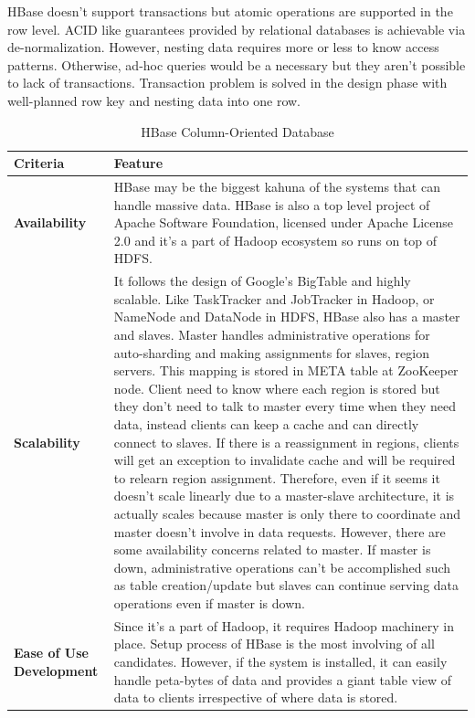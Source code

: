 HBase doesn't support transactions but atomic operations are supported in the row level. ACID like guarantees provided by relational databases is achievable via de-normalization. However, nesting data requires more or less to know access patterns. Otherwise, ad-hoc queries would be a necessary but they aren't possible to lack of transactions. Transaction problem is solved in the design phase with well-planned row key and nesting data into one row.

\begin{table}[!ht]
  \centering
  \caption{HBase Column-Oriented Database}
  \renewcommand{\arraystretch}{1.5}
  \begin{tabular}{| >{\centering\bfseries}m{1in} | >{\centering\arraybackslash}m{4.5in} |}
	\hline
    \textbf{Criteria} & \textbf{Feature} \\
	\hline
    Availability &
    HBase may be the biggest kahuna of the systems that can handle massive data.
    HBase is also a top level project of Apache Software Foundation, licensed under Apache License 2.0 and it's a part of Hadoop ecosystem so runs on top of HDFS.
    \\ \hline
    Scalability &
    It follows the design of Google's BigTable and highly scalable.
    Like TaskTracker and JobTracker in Hadoop, or NameNode and DataNode in HDFS, HBase also has a master and slaves.
    Master handles administrative operations for auto-sharding and making assignments for slaves, region servers.
    This mapping is stored in META table at ZooKeeper node.
    Client need to know where each region is stored but they don't need to talk to master every time when they need data, instead clients can keep a cache and can directly connect to slaves.
    If there is a reassignment in regions, clients will get an exception to invalidate cache and will be required to relearn region assignment.
    Therefore, even if it seems it doesn't scale linearly due to a master-slave architecture, it is actually scales because master is only there to coordinate and master doesn't involve in data requests.
    However, there are some availability concerns related to master.
    If master is down, administrative operations can't be accomplished such as table creation/update but slaves can continue serving data operations even if master is down.
    \\ \hline
    Ease of Use Development &
    Since it's a part of Hadoop, it requires Hadoop machinery in place.
    Setup process of HBase is the most involving of all candidates.
    However, if the system is installed, it can easily handle peta-bytes of data and provides a giant table view of data to clients irrespective of where data is stored.

\end{tabular}
\end{table}
